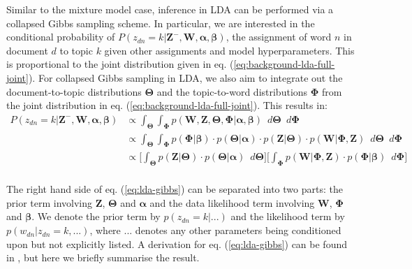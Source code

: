 Similar to the mixture model case, inference in LDA can be performed via a collapsed Gibbs sampling scheme. In particular, we are interested in the conditional probability of $P({z}_{dn}=k \vert \boldsymbol{Z}^{-}, \boldsymbol{W}, \boldsymbol{\alpha}, \boldsymbol{\beta})$, the assignment of word $n$ in document $d$ to topic $k$ given other assignments and model hyperparameters. This is proportional to the joint distribution given in eq. (\ref{eq:background-lda-full-joint}). For collapsed Gibbs sampling in LDA, we also aim to integrate out the document-to-topic distributions $\boldsymbol{\Theta}$ and the topic-to-word distributions $\boldsymbol{\Phi}$ from the joint distribution in eq. (\ref{eq:background-lda-full-joint}). This results in: 
\begin{equation}
\begin{aligned}
P({z}_{dn}=k \vert \boldsymbol{Z}^{-}, \boldsymbol{W}, \boldsymbol{\alpha}, \boldsymbol{\beta}) &\propto \int_{\boldsymbol{\Theta}} \int_{\boldsymbol{\Phi}} p(\boldsymbol{W}, \boldsymbol{Z}, \boldsymbol{\Theta}, \boldsymbol{\Phi} \vert \boldsymbol{\alpha}, \boldsymbol{\beta}) \enspace d\boldsymbol{\Theta} \enspace d\boldsymbol{\Phi} \\
                                                                                                                                                    &\propto \int_{\boldsymbol{\Theta}} \int_{\boldsymbol{\Phi}} p(\boldsymbol{\Phi} \vert \boldsymbol{\beta}) \cdot p(\boldsymbol{\Theta} \vert \boldsymbol{\alpha}) \cdot p(\boldsymbol{Z} \vert \boldsymbol{\Theta}) \cdot  p(\boldsymbol{W} \vert \boldsymbol{\Phi}, \boldsymbol{Z}) \enspace d\boldsymbol{\Theta} \enspace d\boldsymbol{\Phi} \\
                                                                                                                                                    &\propto \Bigg[ \int_{\boldsymbol{\Theta}}  p(\boldsymbol{Z} \vert \boldsymbol{\Theta}) \cdot p(\boldsymbol{\Theta} \vert \boldsymbol{\alpha}) \enspace d\boldsymbol{\Theta} \Bigg] \Bigg[\int_{\boldsymbol{\Phi}} p(\boldsymbol{W} \vert \boldsymbol{\Phi}, \boldsymbol{Z}) \cdot p(\boldsymbol{\Phi} \vert \boldsymbol{\beta}) \enspace d\boldsymbol{\Phi} \Bigg] \\ 
\label{eq:lda-gibbs}
\end{aligned}
\end{equation}

The right hand side of eq. (\ref{eq:lda-gibbs}) can be separated into two parts: the prior term involving $\boldsymbol{Z}$, $\boldsymbol{\Theta}$ and $\boldsymbol{\alpha}$ and the data likelihood term involving $\boldsymbol{W}$, $\boldsymbol{\Phi}$ and $\boldsymbol{\beta}$. We denote the prior term by $p({z}_{dn}=k \vert ...)$ and the likelihood term by $p({w}_{dn} \vert {z}_{dn}=k, ...)$, where $...$ denotes any other parameters being conditioned upon but not explicitly listed. A derivation for eq. (\ref{eq:lda-gibbs}) can be found in \cite{carpenter2010integrating}, but here we briefly summarise the result.

